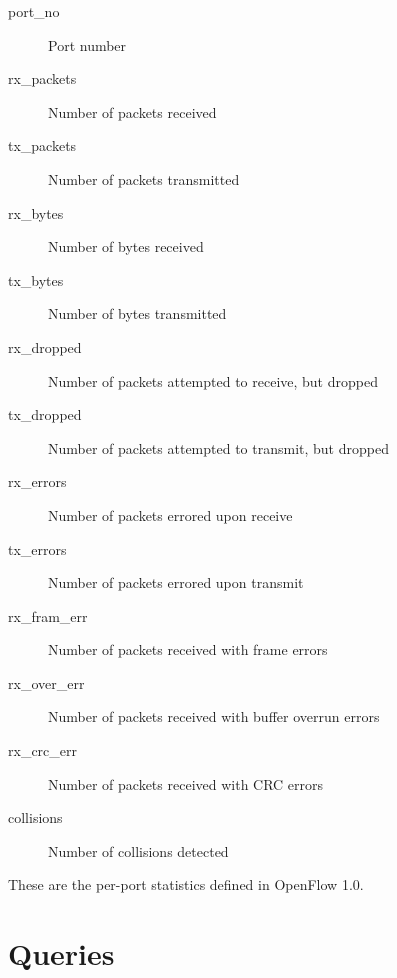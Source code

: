 \begin{description}
\item[port\_no] Port number  
\item[rx\_packets] Number of packets received  
\item[tx\_packets] Number of packets transmitted  
\item[rx\_bytes] Number of bytes received  
\item[tx\_bytes] Number of bytes transmitted  
\item[rx\_dropped] Number of packets attempted to receive, but dropped  
\item[tx\_dropped] Number of packets attempted to transmit, but dropped
\item[rx\_errors] Number of packets errored upon receive 
\item[tx\_errors] Number of packets errored upon transmit
\item[rx\_fram\_err] Number of packets received with frame errors
\item[rx\_over\_err] Number of packets received with buffer overrun errors
\item[rx\_crc\_err] Number of packets received with CRC errors
\item[collisions] Number of collisions detected
\end{description}

These are the per-port statistics defined in OpenFlow 1.0.  

\section{Queries}